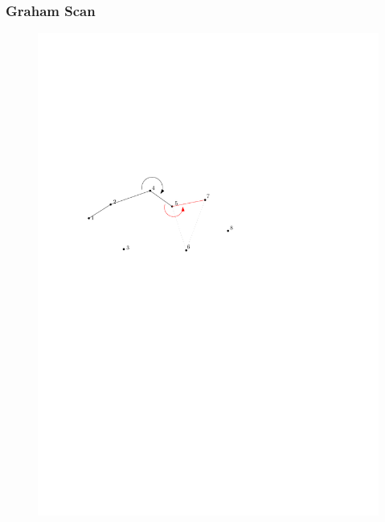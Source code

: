 \begin{frame}
	\frametitle{{Graham Scan}}
\begin{figure}[htbp]
	\begin{center}
  	\includegraphics[width=.8\linewidth]{bilder/graham7}
	\end{center}
\end{figure}
\end{frame}


